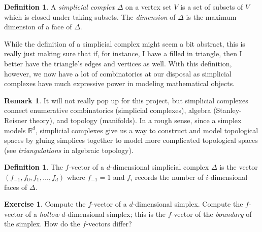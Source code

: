 \documentclass[12pt,a4paper]{article}
\newcommand{\RR}{\mathbb{R}}
\theoremstyle{definition}
\newtheorem{definition}[theorem]{Definition}
\newtheorem{remark}[theorem]{Remark}
\newtheorem{exercise}[theorem]{Exercise}
\numberwithin{equation}{section}
\begin{document}
\begin{definition}
    A \emph{simplicial complex} $\Delta$ on a vertex set $V$ is a set of subsets of $V$ which is closed under taking subsets.
    The \emph{dimension} of $\Delta$ is the maximum dimension of a face of $\Delta$.
\end{definition}

While the definition of a simplicial complex might seem a bit abstract, this is really just making sure that if, for instance, I have a filled in triangle, then I better have the triangle's edges and vertices as well.
With this definition, however, we now have a lot of combinatorics at our disposal as simplicial complexes have much expressive power in modeling mathematical objects.

\begin{remark}
    It will not really pop up for this project, but simplicial complexes connect enumerative combinatorics (simplicial complexes), algebra (Stanley-Reisner theory), and topology (manifolds).
    In a rough sense, since a simplex models $\RR^d$, simplicial complexes give us a way to construct and model topological spaces by gluing simplices together to model more complicated topological spaces (see \emph{triangulations} in algebraic topology).
\end{remark}

\begin{definition}
    The $f$-vector of a $d$-dimensional simplicial complex $\Delta$ is the vector $(f_{-1}, f_0, f_1, \dots, f_d)$ where $f_{-1} = 1$ and $f_i$ records the number of $i$-dimensional faces of $\Delta$.
\end{definition}

\begin{exercise}
    Compute the $f$-vector of a $d$-dimensional simplex.
    Compute the $f$-vector of a \emph{hollow} $d$-dimensional simplex; this is the $f$-vector of the \emph{boundary} of the simplex.
    How do the $f$-vectors differ?
\end{exercise}
\end{document}

